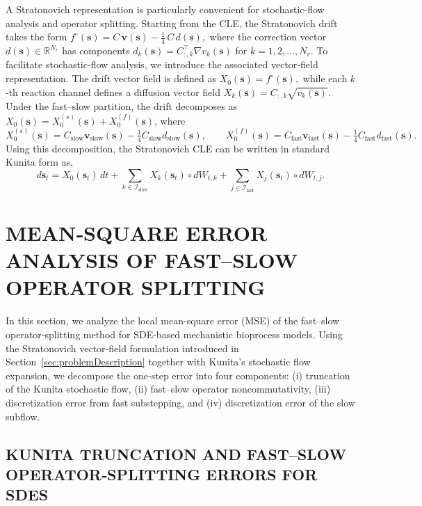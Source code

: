 \documentclass{article}
\begin{document}
A Stratonovich representation is particularly convenient for stochastic-flow
analysis and operator splitting. Starting from the CLE, the Stratonovich drift takes the form
$
f^\circ(\pmb{s})
=
C\,\pmb{v}(\pmb{s})
-\tfrac14\,C\,d(\pmb{s}),
$
where the correction vector $d(\pmb{s})\in\mathbb{R}^{N_r}$ has components
$
d_k(\pmb{s})=C_{:,k}^\top \nabla v_k(\pmb{s})$ for $
k=1,2,\ldots,N_r.$
To facilitate stochastic‑flow analysis, we introduce the associated vector‑field representation. The drift vector field is defined as
\(
X_0(\pmb{s})=f^\circ(\pmb{s}),
\)
while each $k$-th reaction channel defines a diffusion vector field
$
X_k(\pmb{s})=C_{:,k}\sqrt{v_k(\pmb{s})}$. Under the fast–slow partition, the drift decomposes as
$X_0(\pmb{s})=X_0^{(s)}(\pmb{s})+X_0^{(f)}(\pmb{s})$, where
\[
X_0^{(s)}(\pmb{s})
=
C_{\mathrm{slow}}\pmb{v}_{\mathrm{slow}}(\pmb{s})
-\tfrac14 C_{\mathrm{slow}}d_{\mathrm{slow}}(\pmb{s}),
\qquad
X_0^{(f)}(\pmb{s})
=
C_{\mathrm{fast}}\pmb{v}_{\mathrm{fast}}(\pmb{s})
-\tfrac14 C_{\mathrm{fast}}d_{\mathrm{fast}}(\pmb{s}).
\]
Using this decomposition, the Stratonovich CLE can be written in standard Kunita form as,
\begin{equation}
\label{eq:Kunita_form}
d\pmb{s}_t
=
X_0(\pmb{s}_t)\,dt
+
\sum_{k\in\mathcal{I}_{\mathrm{slow}}}
X_k(\pmb{s}_t)\circ dW_{t,k}
+
\sum_{j\in\mathcal{I}_{\mathrm{fast}}}
X_j(\pmb{s}_t)\circ dW_{t,j}.
\end{equation}


\section{MEAN‑SQUARE ERROR ANALYSIS OF FAST–SLOW OPERATOR SPLITTING}
\label{sec:error}

In this section, we analyze the local mean‑square error (MSE) of the fast–slow operator‑splitting method for SDE‑based mechanistic bioprocess models. Using the Stratonovich vector‑field formulation introduced in Section~\ref{sec:problemDescription} together with Kunita’s stochastic flow expansion, we decompose the one‑step error into four components: (i) truncation of the Kunita stochastic flow, (ii) fast–slow operator noncommutativity, (iii) discretization error from fast substepping, and (iv) discretization error of the slow subflow.


\subsection{KUNITA TRUNCATION AND FAST–SLOW OPERATOR‑SPLITTING ERRORS FOR SDES}
\end{document}
